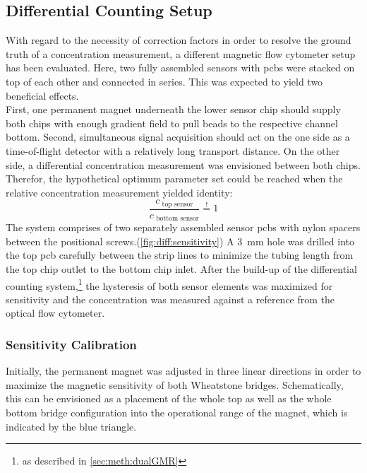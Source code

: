\clearpage
\subsection{Differential Counting Setup}
\label{sec:res:diffCounting}
With regard to the necessity of correction factors in order to resolve the ground truth of a concentration measurement, a different magnetic flow cytometer setup has been evaluated. Here, two fully assembled sensors with \glspl{pcb} were stacked on top of each other and connected in series. This was expected to yield two beneficial effects.\\
First, one permanent magnet underneath the lower sensor chip should supply both chips with enough gradient field to pull beads to the respective channel bottom. Second, simultaneous signal acquisition should act on the one side as a time-of-flight detector with a relatively long transport distance. On the other side, a differential concentration measurement was envisioned between both chips. Therefor, the hypothetical optimum parameter set could be reached when the relative concentration measurement yielded identity:
\begin{equation}
	\dfrac{c_\text{\ top sensor}}{c_\text{\ bottom\ sensor}} \overset{!}{=} 1
	\label{eq:diff:optimum}
\end{equation}
The system comprises of two separately assembled sensor \glspl{pcb} with nylon spacers between the positional screws.(\cref{fig:diff:sensitivity})  A \SI{3}{\milli\meter} hole was drilled into the top \gls{pcb} carefully between the strip lines to minimize the tubing length from the top chip outlet to the bottom chip inlet. 
After the build-up of the differential counting system,\footnote{as described in \cref{sec:meth:dualGMR}} the hysteresis of both sensor elements was maximized for sensitivity and the concentration was measured against a reference from the optical flow cytometer. 

\subsubsection{Sensitivity Calibration}
Initially, the permanent magnet was adjusted in three linear directions in order to maximize the magnetic sensitivity of both Wheatstone bridges. Schematically, this can be envisioned as a placement of the whole top as well as the whole bottom bridge configuration into the operational range of the magnet, which is indicated by the blue triangle.

